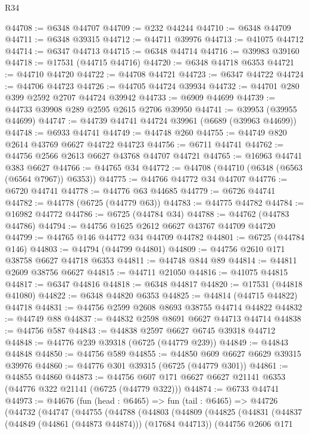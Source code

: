 \begin{lexlean}{R34}
\begin{coremodule}
@44708 := @6348 @44707
@44709 := @232 @44244
@44710 := @6348 @44709
@44711 := @6348 @39315
@44712 := @44711 @39976
@44713 := @41075 @44712
@44714 := @6347 @44713
@44715 := @6348 @44714
@44716 := @39983 @39160
@44718 := @17531 (@44715 @44716)
@44720 := @6348 @44718 @6353
@44721 := @44710 @44720
@44722 := @44708 @44721
@44723 := @6347 @44722
@44724 := @44706 @44723
@44726 := @44705 @44724 @39934
@44732 := @44701 @280 @399 @2592 @2707 @44724 @39942
@44733 := @6909 @44699
@44739 := @44733 @39908 @289 @2595 @2615 @2706 @39950
@44741 := @39953 (@39955 @44699)
@44747 := @44739 @44741 @44724 @39961 (@6689 (@39963 @44699))
@44748 := @6933 @44741
@44749 := @44748 @260
@44755 := @44749 @820 @2614 @43769 @6627 @44722 @44723
@44756 := @6711 @44741
@44762 := @44756 @2566 @2613 @6627 @43768 @44707 @44721
@44765 := @16963 @44741 @383 @6627
@44766 := @44765 @34
@44772 := @44708 (@44710 (@6348 (@6563 (@6564 @7967)) @6353))
@44775 := @44766 @44772 @34 @44707
@44776 := @6720 @44741
@44778 := @44776 @63 @44685
@44779 := @6726 @44741
@44782 := @44778 (@6725 (@44779 @63))
@44783 := @44775 @44782
@44784 := @16982 @44772
@44786 := @6725 (@44784 @34)
@44788 := @44762 (@44783 @44786)
@44794 := @44756 @1625 @2612 @6627 @43767 @44709 @44720
@44799 := @44765 @146 @44772 @34 @44709 @44782
@44801 := @6725 (@44784 @146)
@44803 := @44794 (@44799 @44801)
@44809 := @44756 @2610 @171 @38758 @6627 @44718 @6353
@44811 := @44748 @844 @89
@44814 := @44811 @2609 @38756 @6627
@44815 := @44711 @21050
@44816 := @41075 @44815
@44817 := @6347 @44816
@44818 := @6348 @44817
@44820 := @17531 (@44818 @41080)
@44822 := @6348 @44820 @6353
@44825 := @44814 (@44715 @44822) @44718
@44831 := @44756 @2599 @2608 @8693 @38755 @44714 @44822
@44832 := @44749 @88
@44837 := @44832 @2598 @8691 @6627 @44713 @44714
@44838 := @44756 @587
@44843 := @44838 @2597 @6627 @6745 @39318 @44712
@44848 := @44776 @239 @39318 (@6725 (@44779 @239))
@44849 := @44843 @44848
@44850 := @44756 @589
@44855 := @44850 @609 @6627 @6629 @39315 @39976
@44860 := @44776 @301 @39315 (@6725 (@44779 @301))
@44861 := @44855 @44860
@44873 := @44756 @607 @171 @6627 @6627 @21141 @6353 (@44776 @322 @21141 (@6725 (@44779 @322)))
@44874 := @6733 @44741
@44973 := @44676
    (fun (head : @6465) =>
    fun (tail : @6465) =>
    @44726
      (@44732
        (@44747
          (@44755
            (@44788
              (@44803
                (@44809
                  (@44825
                    (@44831
                      (@44837 (@44849 (@44861 (@44873 @44874))) (@17684 @44713))
                      (@44756
                        @2606
                        @171

\end{coremodule}
\end{lexlean}
